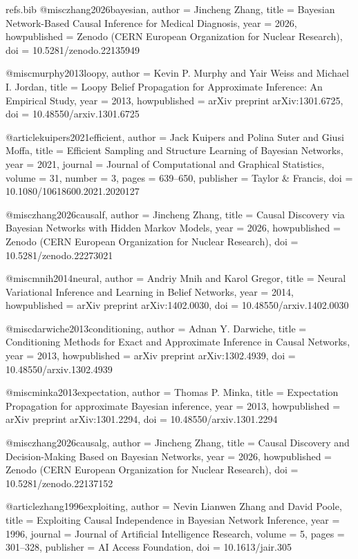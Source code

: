 \begin{filecontents*}[overwrite]{refs.bib}
@misc{zhang2026bayesian,
  author = {Jincheng Zhang},
  title = {{Bayesian Network-Based Causal Inference for Medical Diagnosis}},
  year = {2026},
  howpublished = {Zenodo (CERN European Organization for Nuclear Research)},
  doi = {10.5281/zenodo.22135949}
}

@misc{murphy2013loopy,
  author = {Kevin P. Murphy and Yair Weiss and Michael I. Jordan},
  title = {{Loopy Belief Propagation for Approximate Inference: An Empirical Study}},
  year = {2013},
  howpublished = {arXiv preprint arXiv:1301.6725},
  doi = {10.48550/arxiv.1301.6725}
}

@article{kuipers2021efficient,
  author = {Jack Kuipers and Polina Suter and Giusi Moffa},
  title = {{Efficient Sampling and Structure Learning of Bayesian Networks}},
  year = {2021},
  journal = {Journal of Computational and Graphical Statistics},
  volume = {31},
  number = {3},
  pages = {639--650},
  publisher = {Taylor \& Francis},
  doi = {10.1080/10618600.2021.2020127}
}

@misc{zhang2026causalf,
  author = {Jincheng Zhang},
  title = {{Causal Discovery via Bayesian Networks with Hidden Markov Models}},
  year = {2026},
  howpublished = {Zenodo (CERN European Organization for Nuclear Research)},
  doi = {10.5281/zenodo.22273021}
}

@misc{mnih2014neural,
  author = {Andriy Mnih and Karol Gregor},
  title = {{Neural Variational Inference and Learning in Belief Networks}},
  year = {2014},
  howpublished = {arXiv preprint arXiv:1402.0030},
  doi = {10.48550/arxiv.1402.0030}
}

@misc{darwiche2013conditioning,
  author = {Adnan Y. Darwiche},
  title = {{Conditioning Methods for Exact and Approximate Inference in Causal Networks}},
  year = {2013},
  howpublished = {arXiv preprint arXiv:1302.4939},
  doi = {10.48550/arxiv.1302.4939}
}

@misc{minka2013expectation,
  author = {Thomas P. Minka},
  title = {{Expectation Propagation for approximate Bayesian inference}},
  year = {2013},
  howpublished = {arXiv preprint arXiv:1301.2294},
  doi = {10.48550/arxiv.1301.2294}
}

@misc{zhang2026causalg,
  author = {Jincheng Zhang},
  title = {{Causal Discovery and Decision-Making Based on Bayesian Networks}},
  year = {2026},
  howpublished = {Zenodo (CERN European Organization for Nuclear Research)},
  doi = {10.5281/zenodo.22137152}
}

@article{zhang1996exploiting,
  author = {Nevin Lianwen Zhang and David Poole},
  title = {{Exploiting Causal Independence in Bayesian Network Inference}},
  year = {1996},
  journal = {Journal of Artificial Intelligence Research},
  volume = {5},
  pages = {301--328},
  publisher = {AI Access Foundation},
  doi = {10.1613/jair.305}
}


\end{filecontents*}
